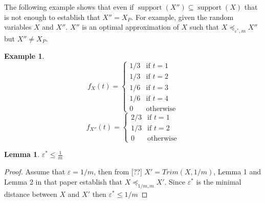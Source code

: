 \documentclass[review]{elsarticle}
\newtheorem{lemma}{Lemma}
\newtheorem{example}{Example}
\DeclareMathOperator{\support}{support}
\begin{document}
%
%     

The following example shows that even if $\support(X'')\subseteq \support(X)$ that is not enough to establish that $X''=X_P$. For example, given the random variables $X$ and $X''$. $X''$ is an optimal approximation of $X$ such that $X\preceq_{\varepsilon^*,m} X''$ but $X''\neq X_P$. 
\begin{example}
$$
f_{X}(t) = \begin{cases}
1/3           & \text{if } t=1  \\ 
1/3           & \text{if } t=2  \\  
1/6           & \text{if } t=3  \\  
1/6           & \text{if } t=4  \\ 
0                         & \text{otherwise}
\end{cases}
$$
$$
f_{X''}(t) = \begin{cases}
2/3           & \text{if } t=1  \\ 
1/3           & \text{if } t=2  \\  
0                         & \text{otherwise}
\end{cases}
$$
\end{example}


\begin{lemma}\label{errorM}
$\varepsilon^* \leq \frac{1}{m}$
\end{lemma}
\begin{proof}
Assume that $\varepsilon=1/m$, then from [??] $X'=Trim(X,1/m)$, Lemma 1 and Lemma 2 in that paper establish that $X\preceq_{1/m, m} X'$. Since $\varepsilon^*$ is the minimal distance between $X$ and $X'$ then $\varepsilon^*\leq 1/m $
\end{proof}
\end{document}

